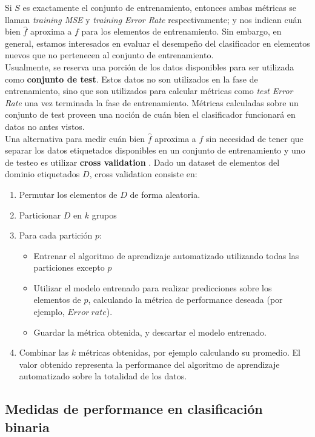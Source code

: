 Si $S$ es exactamente el conjunto de entrenamiento, entonces ambas métricas se llaman \textit{training MSE} y \textit{training Error Rate} respectivamente; y nos indican cuán bien $\hat{f}$ aproxima a $f$ para los elementos de entrenamiento. Sin embargo, en general, estamos interesados en evaluar el desempeño del clasificador en elementos nuevos que no pertenecen al conjunto de entrenamiento.  \\

Usualmente, se reserva una porción de los datos disponibles para ser utilizada como \textbf{conjunto de test}. Estos datos no son utilizados en la fase de entrenamiento, sino que son utilizados para calcular métricas como \textit{test Error Rate} una vez terminada la fase de entrenamiento. Métricas calculadas sobre un conjunto de test proveen una noción de cuán bien el clasificador funcionará en datos no antes vistos. \\

Una alternativa para medir cuán bien $\hat{f}$ aproxima a $f$ sin necesidad de tener que separar los datos etiquetados disponibles en un conjunto de entrenamiento y uno de testeo es utilizar \textbf{cross validation} \cite{cross_validation}. Dado un dataset de elementos del dominio etiquetados $D$, cross validation consiste en:
\label{cross_validation}
\begin{enumerate}
\item Permutar los elementos de $D$ de forma aleatoria.
\item Particionar $D$ en $k$ grupos
\item Para cada partición $p$:
\begin{itemize}
\item Entrenar el algoritmo de aprendizaje automatizado utilizando todas las particiones excepto $p$
\item Utilizar el modelo entrenado para realizar predicciones sobre los elementos de $p$, calculando la métrica de performance deseada (por ejemplo, $Error \ rate$).
\item Guardar la métrica obtenida, y descartar el modelo entrenado.
\end{itemize}
\item Combinar las $k$ métricas obtenidas, por ejemplo calculando su promedio. El valor obtenido representa la performance del algoritmo de aprendizaje automatizado sobre la totalidad de los datos.
\end{enumerate}

\subsection{Medidas de performance en clasificación binaria}

